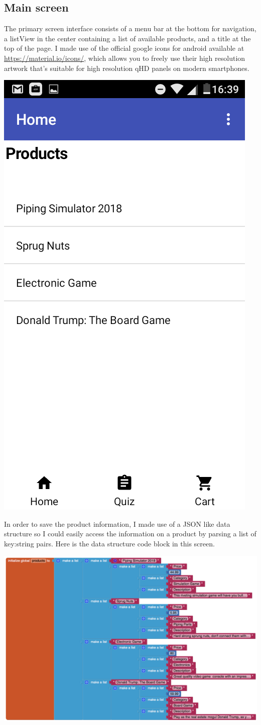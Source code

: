 \documentclass{scrreprt}
\begin{document}
\subsection{Main screen}

The primary screen interface consists of a menu bar at the bottom for navigation, a listView in the center containing a list of available products, and a title at the top of the page. I made use of the official google icons for android available at \url{https://material.io/icons/}, which allows you to freely use their high resolution artwork that's suitable for high resolution qHD panels on modern smartphones.

\begin{center}
    \includegraphics[width=0.5\linewidth]{images/mainDesign.png}
\end{center}

In order to save the product information, I made use of a JSON like data structure so I could easily access the information on a product by parsing a list of key:string pairs. Here is the data structure code block in this screen.

\begin{center}
    \includegraphics[width=\linewidth]{images/mainList.png}
\end{center}
\end{document}
